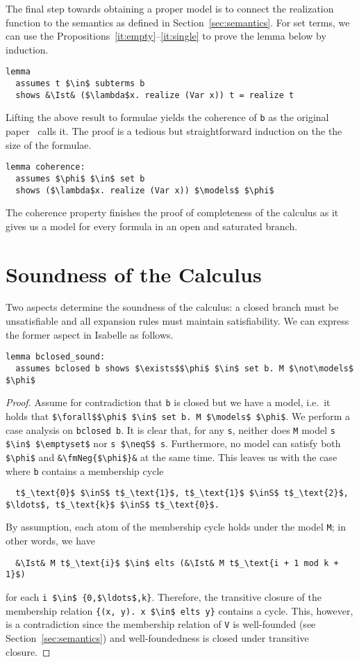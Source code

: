 \documentclass[sigplan,10pt,anonymous,review]{acmart}
\newcommand{\inS}{\in_\text{s}}
\newcommand{\neqS}{\neq_\text{s}}
\newcommand{\Ist}{I$_\text{st}$}
\newcommand{\fmNeg}[1]{$\boldsymbol{\neg}$ #1}
\begin{document}
\noindent The final step towards obtaining a proper model is to connect the realization function to the semantics as defined in Section~\ref{sec:semantics}.
For set terms, we can use the Propositions~\ref{it:empty}--\ref{it:single} to prove the lemma below by induction.
\begin{lstlisting}
lemma
  assumes t $\in$ subterms b
  shows &\Ist& ($\lambda$x. realize (Var x)) t = realize t
\end{lstlisting}
Lifting the above result to formulae yields the coherence of \lstinline!b! as the original paper~\cite{new_fast_tableau} calls it.
The proof is a tedious but straightforward induction on the the size of the formulae.
\begin{lstlisting}
lemma coherence:
  assumes $\phi$ $\in$ set b
  shows ($\lambda$x. realize (Var x)) $\models$ $\phi$
\end{lstlisting}
The coherence property finishes the proof of completeness of the calculus as it gives us a model for every formula in an open and saturated branch.

\section{Soundness of the Calculus}
Two aspects determine the soundness of the calculus: a closed branch must be unsatisfiable and all expansion rules must maintain satisfiability.
We can express the former aspect in Isabelle as follows.
\begin{lstlisting}[belowskip=0pt]
lemma bclosed_sound:
  assumes bclosed b shows $\exists$$\phi$ $\in$ set b. M $\not\models$ $\phi$
\end{lstlisting}
\begin{proof}
  Assume for contradiction that \lstinline!b! is closed but we have a model, i.e.\ it holds that \lstinline!$\forall$$\phi$ $\in$ set b. M $\models$ $\phi$!.
  We perform a case analysis on \lstinline!bclosed b!.
  It is clear that, for any \lstinline!s!, neither does \lstinline!M! model \lstinline!s $\in$ $\emptyset$! nor \lstinline!s $\neqS$ s!.
  Furthermore, no model can satisfy both \lstinline!$\phi$! and \lstinline!&\fmNeg{$\phi$}&! at the same time.
  This leaves us with the case where \lstinline!b! contains a membership cycle
\begin{lstlisting}
  t$_\text{0}$ $\inS$ t$_\text{1}$, t$_\text{1}$ $\inS$ t$_\text{2}$, $\ldots$, t$_\text{k}$ $\inS$ t$_\text{0}$.
\end{lstlisting}
  By assumption, each atom of the membership cycle holds under the model \lstinline!M!; in other words, we have
\begin{lstlisting}
  &\Ist& M t$_\text{i}$ $\in$ elts (&\Ist& M t$_\text{i + 1 mod k + 1}$)
\end{lstlisting}
  for each \lstinline!i $\in$ {0,$\ldots$,k}!.
  Therefore, the transitive closure of the membership relation \lstinline!{(x, y). x $\in$ elts y}! contains a cycle. 
  This, however, is a contradiction since the membership relation of \lstinline!V! is well-founded (see Section~\ref{sec:semantics}) and well-foundedness is closed under transitive closure.
\end{proof}
\end{document}
